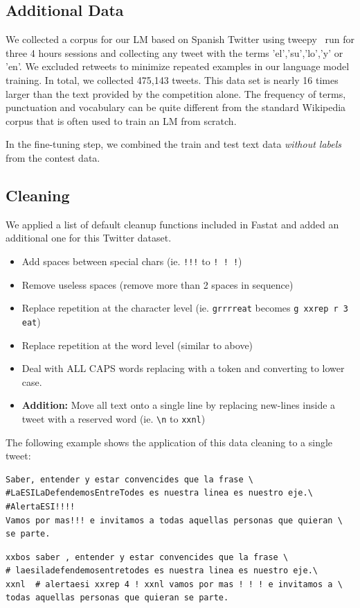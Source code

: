 \documentclass[runningheads]{llncs}
\begin{document}
\subsection{Additional Data}
We collected a corpus for our LM based on Spanish Twitter using tweepy~\cite{Tweepy} run for three 4 hours sessions and collecting any tweet with the terms 'el','su','lo','y' or 'en'. We excluded retweets to minimize repeated examples in our language model training.  In total, we collected 475,143 tweets.  This data set is nearly 16 times larger than the text provided by the competition alone.  The frequency of terms, punctuation and vocabulary can be quite different from the standard Wikipedia corpus that is often used to train an LM from scratch.  

In the fine-tuning step, we combined the train and test text data \textit{without labels} from the contest data.
\subsection{Cleaning}
We applied a list of default cleanup functions included in Fastat and added an additional one for this Twitter dataset.
\begin{itemize}
	\item Add spaces between special chars (ie. \verb|!!!| to \verb|! ! !|)
	\item Remove useless spaces (remove more than 2 spaces in sequence)
	\item Replace repetition at the character level (ie. \verb|grrrreat| becomes \verb|g xxrep r 3 eat|)
	\item Replace repetition at the word level (similar to above)
	\item Deal with ALL CAPS words replacing with a token and converting to lower case.
	\item \textbf{Addition:} Move all text onto a single line by replacing new-lines inside a tweet with a reserved word (ie. \verb|\n| to \verb|xxnl|)
\end{itemize} 
The following example shows the application of this data cleaning to a single tweet:
\begin{verbatim} 
Saber, entender y estar convencides que la frase \
#LaESILaDefendemosEntreTodes es nuestra linea es nuestro eje.\
#AlertaESI!!!!
Vamos por mas!!! e invitamos a todas aquellas personas que quieran \
se parte.
\end{verbatim}

\begin{verbatim} 
xxbos saber , entender y estar convencides que la frase \
# laesiladefendemosentretodes es nuestra linea es nuestro eje.\
xxnl  # alertaesi xxrep 4 ! xxnl vamos por mas ! ! ! e invitamos a \
todas aquellas personas que quieran se parte.
\end{verbatim}
\end{document}
